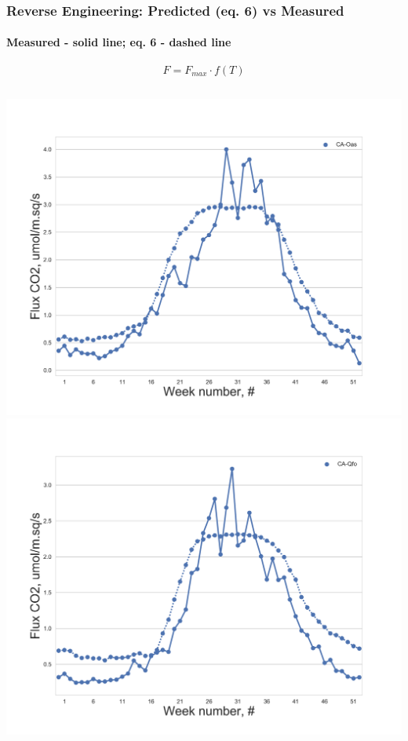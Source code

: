 \documentclass{beamer}
\begin{document}
\begin{frame}
\frametitle{Reverse Engineering: Predicted (eq. 6) vs Measured}
\framesubtitle{Measured - solid line; eq. 6 - dashed line}

\begin{equation}
\label{eq:T}
    F = F_{max}\cdot f(T)
\end{equation}

\begin{columns}[t]
\centering
\includegraphics[width=\textwidth]{Reverse_engin_only_T/10.png}\\
\includegraphics[width=\textwidth]{Reverse_engin_only_T/14.png}

\end{columns}
\end{frame}
\end{document}
